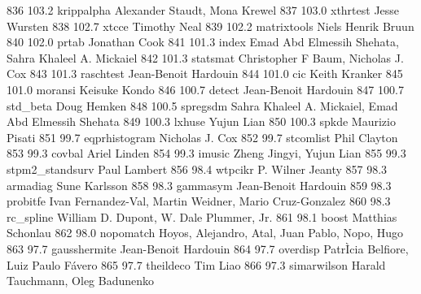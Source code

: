    836    103.2    krippalpha    Alexander Staudt, Mona Krewel           
   837    103.0    xthrtest      Jesse Wursten                           
   838    102.7    xtcce         Timothy Neal                            
   839    102.2    matrixtools   Niels Henrik Bruun                      
   840    102.0    prtab         Jonathan Cook                           
   841    101.3    index         Emad Abd Elmessih Shehata, Sahra        
                                   Khaleel A. Mickaiel                     
   842    101.3    statsmat      Christopher F Baum, Nicholas J. Cox     
   843    101.3    raschtest     Jean-Benoit Hardouin                    
   844    101.0    cic           Keith Kranker                           
   845    101.0    moransi       Keisuke Kondo                           
   846    100.7    detect        Jean-Benoit Hardouin                    
   847    100.7    std_beta      Doug Hemken                             
   848    100.5    spregsdm      Sahra Khaleel A. Mickaiel, Emad Abd     
                                   Elmessih Shehata                        
   849    100.3    lxhuse        Yujun Lian                              
   850    100.3    spkde         Maurizio Pisati                         
   851     99.7    eqprhistogram  Nicholas J. Cox                         
   852     99.7    stcomlist     Phil Clayton                            
   853     99.3    covbal        Ariel Linden                            
   854     99.3    imusic        Zheng Jingyi, Yujun Lian                
   855     99.3    stpm2_standsurv  Paul Lambert                            
   856     98.4    wtpcikr       P. Wilner Jeanty                        
   857     98.3    armadiag      Sune Karlsson                           
   858     98.3    gammasym      Jean-Benoit Hardouin                    
   859     98.3    probitfe      Ivan Fernandez-Val, Martin Weidner,     
                                   Mario Cruz-Gonzalez                     
   860     98.3    rc_spline     William D. Dupont, W. Dale Plummer, Jr. 
   861     98.1    boost         Matthias Schonlau                       
   862     98.0    nopomatch     Hoyos, Alejandro, Atal, Juan Pablo,     
                                   Nopo, Hugo                              
   863     97.7    gausshermite  Jean-Benoit Hardouin                    
   864     97.7    overdisp      PatrÌcia Belfiore, Luiz Paulo Fávero  
   865     97.7    theildeco     Tim Liao                                
   866     97.3    simarwilson   Harald Tauchmann, Oleg Badunenko        
